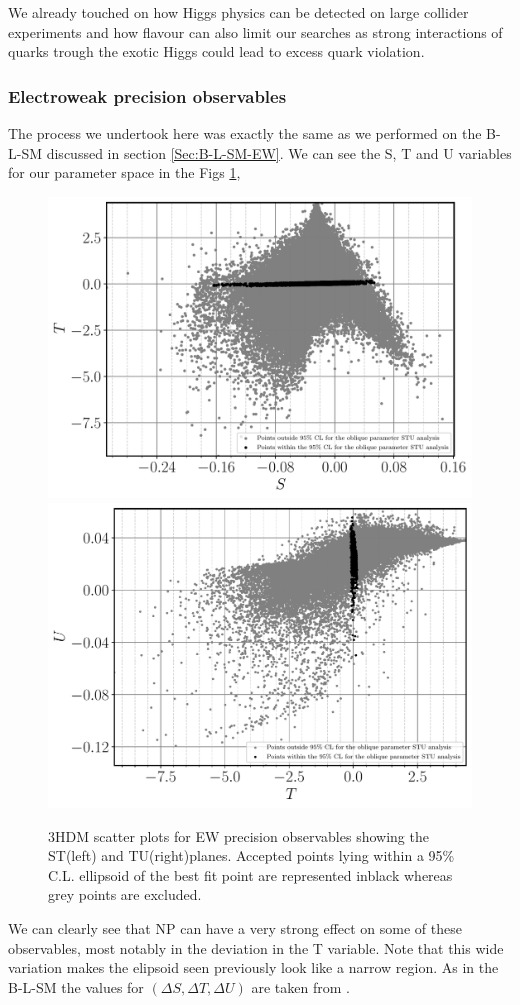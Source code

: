 \documentclass[10pt]{book}
\renewcommand{\(}{\left(}
\renewcommand{\)}{\right)}
\renewcommand{\[}{\left[}
\renewcommand{\]}{\right]}
\begin{document}
We already touched on how Higgs physics can be detected on large collider experiments and how flavour can also limit our searches as strong interactions of quarks trough the exotic Higgs could lead to excess quark violation. %
%
\subsubsection{Electroweak precision observables}

The process we undertook here was exactly the same as we performed on the B-L-SM discussed in section \ref{Sec:B-L-SM-EW}. 
%
We can see the S, T and U variables for our parameter space in the Figs \ref{Fig:3HDM_STU}, 
%
\begin{figure}[H]
	\centering
	\includegraphics[width=.49\textwidth]{Images/3HDM/EW/EW_S_T_black.pdf}	
	\includegraphics[width=.49\textwidth]{Images/3HDM/EW/EW_T_U_black.pdf}
	\caption{3HDM scatter plots for EW  precision  observables  showing  the ST(left)  and TU(right)planes.  Accepted points lying within a 95\% C.L. ellipsoid of the best fit point are represented inblack whereas grey points are excluded.}
	\label{Fig:3HDM_STU}
\end{figure}
%
We can clearly see that NP can have a very strong effect on some of these observables, most notably in the deviation in the T variable.
%
Note that this wide variation makes the elipsoid seen previously look like a narrow region. 
%
As in the B-L-SM the values for $(\Delta S , \Delta T , \Delta U )$ are taken from \cite{Baak_2012}.
\end{document}
